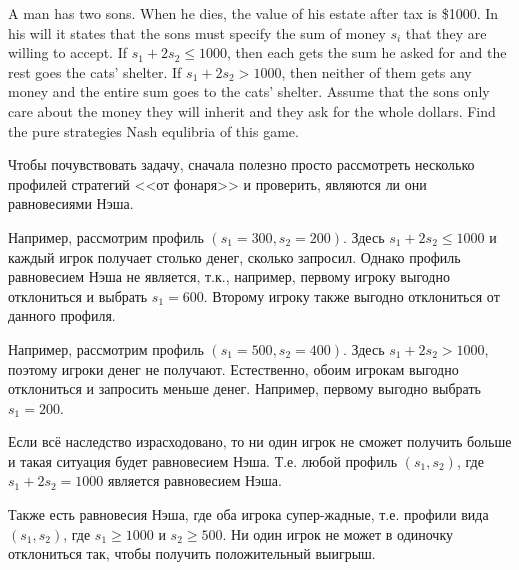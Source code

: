 \begin{problem}
A man has two sons. When he dies, the value of his estate after tax is \$1000. In his will it states that the sons must specify the sum of money $s_i$ that they are willing to accept. If $s_1+2s_2\leq 1000$, then each gets the sum he asked for and the rest goes the cats’ shelter. If $s_1+2s_2> 1000$, then neither of them gets any money and the entire sum goes to the cats’ shelter. Assume that the sons only care about the money they will inherit and they ask for the whole dollars. Find the pure strategies Nash equlibria of this game.


\begin{sol}
Чтобы почувствовать задачу, сначала полезно просто рассмотреть несколько профилей стратегий <<от фонаря>> и проверить, являются ли они равновесиями Нэша.

Например, рассмотрим профиль $(s_1=300,s_2=200)$. Здесь $s_1+2s_2\leq 1000$ и каждый игрок получает столько денег, сколько запросил. Однако профиль  равновесием Нэша не является, т.к., например, первому игроку выгодно отклониться и выбрать $s_1=600$.  Второму игроку также выгодно отклониться от данного профиля.

Например, рассмотрим профиль $(s_1=500,s_2=400)$. Здесь $s_1+2s_2>1000$, поэтому игроки денег не получают. Естественно, обоим игрокам выгодно отклониться и запросить меньше денег. Например, первому выгодно выбрать $s_1=200$.

Если всё наследство израсходовано, то ни один игрок не сможет получить больше и такая ситуация будет равновесием Нэша. Т.е. любой профиль $(s_1,s_2)$, где  $s_1+2s_2=1000$ является равновесием Нэша.

Также есть равновесия Нэша, где оба игрока супер-жадные, т.е. профили вида $(s_1,s_2)$, где $s_1\geq 1000$ и $s_2 \geq 500$. Ни один игрок не может в одиночку отклониться так, чтобы получить положительный выигрыш.
\end{sol}
\end{problem}

